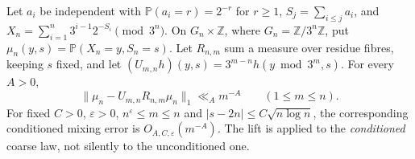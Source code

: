 \begin{proposition}
\label{prop:Tao-joint-total-mixing}
Let $a_i$ be independent with $\mathbb P(a_i=r)=2^{-r}$ for $r\ge1$,
$S_j=\sum_{i\le j}a_i$, and
$X_n=\sum_{i=1}^n3^{i-1}2^{-S_i}\pmod{3^n}$.
On $G_n\times\mathbb Z$, where $G_n=\mathbb Z/3^n\mathbb Z$, put
$\mu_n(y,s)=\mathbb P(X_n=y,S_n=s)$. Let $R_{n,m}$ sum a measure over
residue fibres, keeping $s$ fixed, and let
$(U_{m,n}h)(y,s)=3^{m-n}h(y\bmod3^m,s)$.
For every $A>0$,
\[
 \|\mu_n-U_{m,n}R_{n,m}\mu_n\|_1\ll_A m^{-A}
 \qquad(1\le m\le n).
\]
For fixed $C>0$, $\varepsilon>0$, $n^\varepsilon\le m\le n$ and
$|s-2n|\le C\sqrt{n\log n}$, the corresponding conditioned mixing
error is $O_{A,C,\varepsilon}(m^{-A})$. The lift is applied to the
\emph{conditioned} coarse law, not silently to the unconditioned one.
\end{proposition}

